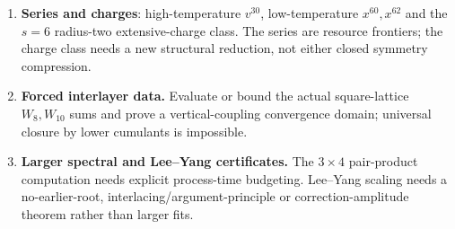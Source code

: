 \documentclass[11pt]{article}
\theoremstyle{definition}
\begin{document}
\begin{enumerate}[leftmargin=*,itemsep=2pt]
      requires the actual nonidentical/spectral/IRF/dynamical equations.
\item \textbf{Series and charges}: high-temperature $v^{30}$, low-temperature $x^{60},x^{62}$ and
      the $s=6$ radius-two extensive-charge class. The series are resource frontiers; the charge
      class needs a new structural reduction, not either closed symmetry compression.
\item \textbf{Forced interlayer data.} Evaluate or bound the actual square-lattice $W_8,W_{10}$
      sums and prove a vertical-coupling convergence domain; universal closure by lower cumulants
      is impossible.
\item \textbf{Larger spectral and Lee--Yang certificates.} The $3\times4$ pair-product computation
      needs explicit process-time budgeting. Lee--Yang scaling needs a no-earlier-root,
      interlacing/argument-principle or correction-amplitude theorem rather than larger fits.
\end{enumerate}
\end{document}

